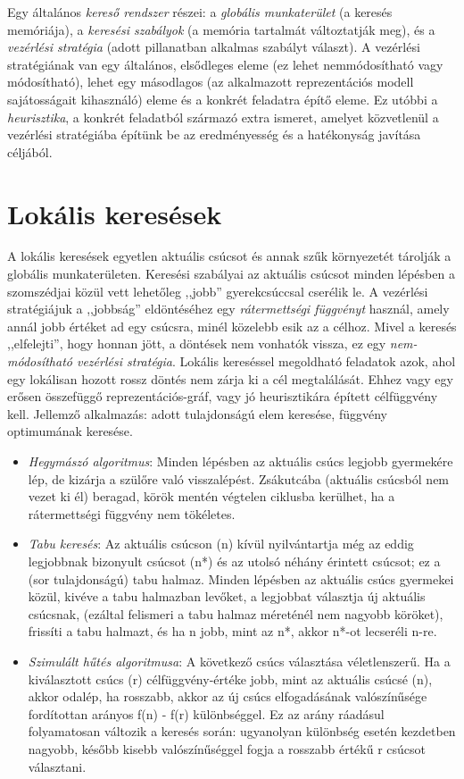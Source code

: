 \documentclass[margin=0px]{article}
\begin{document}
Egy általános \textit{kereső rendszer} részei: a \textit{globális munkaterület} (a keresés memóriája), a \textit{keresési szabályok} (a memória tartalmát változtatják meg), és a \textit{vezérlési stratégia} (adott pillanatban alkalmas szabályt választ). A vezérlési stratégiának van egy általános, elsődleges eleme (ez lehet nemmódosítható vagy módosítható), lehet egy másodlagos (az alkalmazott reprezentációs modell sajátosságait kihasználó) eleme és a konkrét feladatra építő eleme. Ez utóbbi a \textit{heurisztika}, a konkrét feladatból származó extra ismeret, amelyet közvetlenül a vezérlési stratégiába építünk be az eredményesség és a hatékonyság javítása céljából.

\section{Lokális keresések}

A lokális keresések egyetlen aktuális csúcsot és annak szűk környezetét tárolják a globális munkaterületen. Keresési szabályai az aktuális csúcsot minden lépésben a szomszédjai közül vett lehetőleg  ,,jobb” gyerekcsúccsal cserélik le. A vezérlési stratégiájuk a ,,jobbság” eldöntéséhez egy \textit{rátermettségi függvényt} használ, amely annál jobb értéket ad egy csúcsra, minél közelebb esik az a célhoz. Mivel a keresés ,,elfelejti”, hogy honnan jött, a döntések nem vonhatók vissza, ez egy \textit{nem-módosítható vezérlési stratégia}.
Lokális kereséssel megoldható feladatok azok, ahol egy lokálisan hozott rossz döntés nem zárja ki a cél megtalálását. Ehhez vagy egy erősen összefüggő reprezentációs-gráf, vagy jó heurisztikára épített
célfüggvény kell. Jellemző alkalmazás: adott tulajdonságú elem keresése, függvény optimumának keresése.
\begin{itemize}
    \item \textit{Hegymászó algoritmus}: Minden lépésben az aktuális csúcs legjobb gyermekére lép, de kizárja a szülőre való visszalépést. Zsákutcába (aktuális csúcsból nem vezet ki él) beragad, körök mentén végtelen ciklusba kerülhet, ha a rátermettségi függvény nem tökéletes.
    \item \textit{Tabu keresés}: Az aktuális csúcson (n) kívül nyilvántartja még az eddig legjobbnak bizonyult csúcsot (n*) és az utolsó néhány érintett csúcsot; ez a (sor tulajdonságú) tabu halmaz. Minden lépésben az aktuális csúcs gyermekei közül, kivéve a tabu halmazban levőket, a legjobbat választja új aktuális csúcsnak, (ezáltal felismeri a tabu halmaz méreténél nem nagyobb köröket), frissíti a tabu halmazt, és ha n jobb, mint az n*, akkor n*-ot lecseréli n-re.
    \item \textit{Szimulált hűtés algoritmusa}: A következő csúcs választása véletlenszerű. Ha a kiválasztott csúcs (r) célfüggvény-értéke jobb, mint az aktuális csúcsé (n), akkor odalép, ha rosszabb, akkor az új csúcs elfogadásának valószínűsége fordítottan arányos f(n) - f(r) különbséggel. Ez az arány ráadásul folyamatosan változik a keresés során: ugyanolyan különbség esetén kezdetben nagyobb, később kisebb valószínűséggel fogja a rosszabb értékű r csúcsot választani.
\end{itemize}
\end{document}
